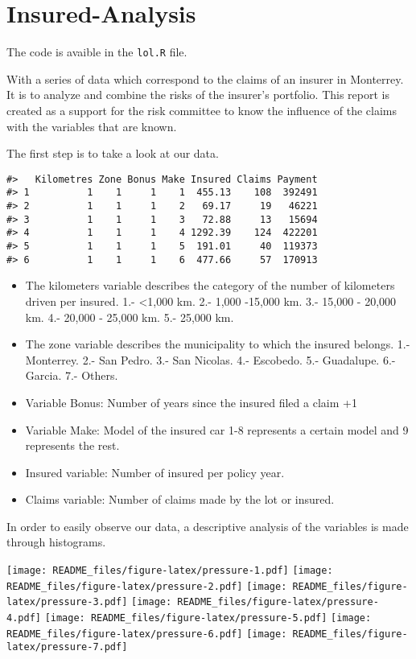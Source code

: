 \documentclass[
]{article}
\author{}
\date{\vspace{-2.5em}}
\begin{document}
\hypertarget{insured-analysis}{%
\section{Insured-Analysis}\label{insured-analysis}}

The code is avaible in the \texttt{lol.R} file.

With a series of data which correspond to the claims of an insurer in
Monterrey. It is to analyze and combine the risks of the insurer's
portfolio. This report is created as a support for the risk committee to
know the influence of the claims with the variables that are known.

The first step is to take a look at our data.

\begin{verbatim}
#>   Kilometres Zone Bonus Make Insured Claims Payment
#> 1          1    1     1    1  455.13    108  392491
#> 2          1    1     1    2   69.17     19   46221
#> 3          1    1     1    3   72.88     13   15694
#> 4          1    1     1    4 1292.39    124  422201
#> 5          1    1     1    5  191.01     40  119373
#> 6          1    1     1    6  477.66     57  170913
\end{verbatim}

\begin{itemize}
\item
  The kilometers variable describes the category of the number of
  kilometers driven per insured. 1.- \textless1,000 km. 2.- 1,000
  -15,000 km. 3.- 15,000 - 20,000 km. 4.- 20,000 - 25,000 km. 5.- 25,000
  km.
\item
  The zone variable describes the municipality to which the insured
  belongs. 1.- Monterrey. 2.- San Pedro. 3.- San Nicolas. 4.- Escobedo.
  5.- Guadalupe. 6.- Garcia. 7.- Others.
\item
  Variable Bonus: Number of years since the insured filed a claim +1
\item
  Variable Make: Model of the insured car 1-8 represents a certain model
  and 9 represents the rest.
\item
  Insured variable: Number of insured per policy year.
\item
  Claims variable: Number of claims made by the lot or insured.
\end{itemize}

In order to easily observe our data, a descriptive analysis of the
variables is made through histograms.

\texttt{[image: README\_files/figure-latex/pressure-1.pdf]}
\texttt{[image: README\_files/figure-latex/pressure-2.pdf]}
\texttt{[image: README\_files/figure-latex/pressure-3.pdf]}
\texttt{[image: README\_files/figure-latex/pressure-4.pdf]}
\texttt{[image: README\_files/figure-latex/pressure-5.pdf]}
\texttt{[image: README\_files/figure-latex/pressure-6.pdf]}
\texttt{[image: README\_files/figure-latex/pressure-7.pdf]}
\end{document}

